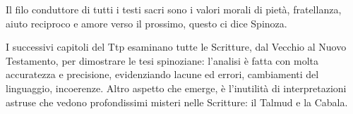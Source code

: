 Il filo conduttore di tutti i testi sacri sono i valori morali di pietà, fratellanza, aiuto reciproco e amore verso il prossimo, questo ci dice Spinoza.

I successivi capitoli del Ttp esaminano tutte le Scritture, dal Vecchio al Nuovo Testamento, per dimostrare le tesi spinoziane: l'analisi è fatta con molta accuratezza e precisione, evidenziando lacune ed errori, cambiamenti del linguaggio, incoerenze. Altro aspetto che emerge, è l'inutilità di interpretazioni astruse che vedono profondissimi misteri nelle Scritture: il Talmud e la Cabala.






\newpage
